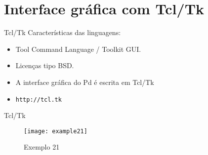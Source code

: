 \section{Interface gráfica com Tcl/Tk}


\begin{frame}{Tcl/Tk}
Características das linguagens:
\begin{itemize}
\item Tool Command Language / Toolkit GUI.
\item Licenças tipo BSD.
\item A interface gráfica do Pd é escrita em Tcl/Tk
\item \texttt{http://tcl.tk}
\end{itemize}
\end{frame}


\begin{frame}{Tcl/Tk}
\begin{figure}[h!]
\centering
\texttt{[image: example21]}
\caption{Exemplo 21}
\end{figure}
\end{frame}
